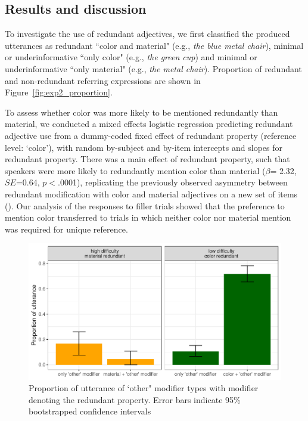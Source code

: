 \documentclass[12pt,letterpaper]{article}
\begin{document}
\subsection{Results and discussion}

To investigate the use of redundant adjectives, we first classified the produced utterances as redundant ``color and material"  (e.g., \textit{the blue metal chair}), minimal or underinformative ``only color" (e.g., \textit{the green cup}) and minimal or underinformative ``only material" (e.g., \textit{the metal chair}). Proportion of redundant  and non-redundant referring expressions are shown in Figure~\ref{fig:exp2_proportion}. 

To assess whether color was more likely to be mentioned redundantly than material, we conducted a mixed effects logistic regression predicting redundant adjective use from a dummy-coded fixed effect of redundant property  (reference level: `color'), with random by-subject and by-item intercepts and slopes for redundant property. There was a main effect of redundant property, such that speakers were more likely to redundantly mention color than material ($\beta$= 2.32, $SE$=0.64, $p$$<$.0001), replicating the previously observed asymmetry between redundant modification with color and material adjectives on a new set of items (\citealt{Sedivy2005,EttingerFernandez2020}). Our analysis of the responses to filler trials showed that the preference to mention color transferred to trials in which neither color nor material mention was required for unique reference.

\begin{figure}[ht]
   \centering
   \includegraphics[width=.8\textwidth]{plots/exp2_other.pdf}
   \caption{Proportion of utterance of `other" modifier types with modifier denoting the redundant property. Error bars indicate 95\% bootstrapped confidence intervals} 
   \label{fig:exp2_other}
   \end{figure}
\end{document}
